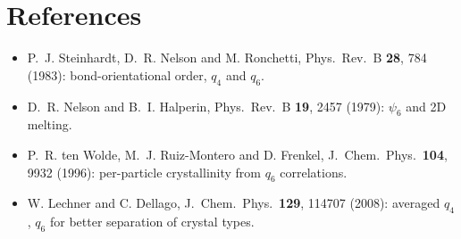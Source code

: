 \documentclass[11pt]{article}
\begin{document}
\section*{References}
\begin{itemize}[nosep]
  \item P.~J. Steinhardt, D.~R. Nelson and M. Ronchetti, Phys.\ Rev.\ B
        \textbf{28}, 784 (1983): bond-orientational order, $q_4$ and $q_6$.
  \item D.~R. Nelson and B.~I. Halperin, Phys.\ Rev.\ B \textbf{19}, 2457
        (1979): $\psi_6$ and 2D melting.
  \item P.~R. ten Wolde, M.~J. Ruiz-Montero and D. Frenkel, J.\ Chem.\ Phys.\
        \textbf{104}, 9932 (1996): per-particle crystallinity from $q_6$
        correlations.
  \item W. Lechner and C. Dellago, J.\ Chem.\ Phys.\ \textbf{129}, 114707
        (2008): averaged $q_4$, $q_6$ for better separation of crystal types.
\end{itemize}
\end{document}
